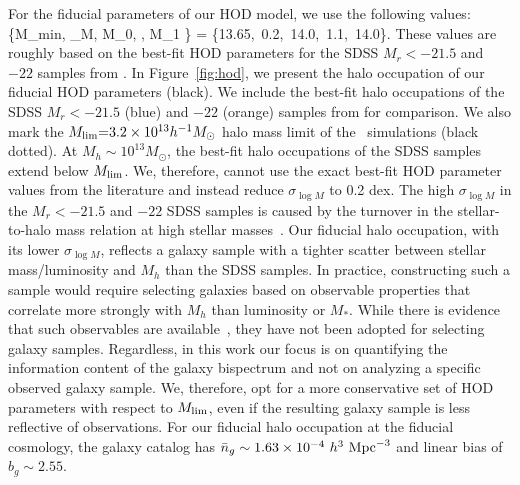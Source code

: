 For the fiducial parameters of our HOD model, we use the following values: 
\beq \label{eq:hod_fid}
\{\log M_{\rm min}, \sigma_{\log M}, \log M_0, \alpha, \log M_1 \} = \{13.65,~0.2,~14.0,~1.1,~14.0\}.
\eeq
These values are roughly based on the best-fit HOD parameters for the SDSS $M_r
< -21.5$ and $-22$ samples from \cite{zheng2007}. 
In Figure~\ref{fig:hod}, we present the halo occupation of our fiducial 
HOD parameters (black). We include the best-fit halo occupations of 
the SDSS $M_r < -21.5$ (blue)  and $-22$ (orange) samples from \cite{zheng2007}
for comparison. We also mark the  $M_{\rm lim}{=}3.2\times10^{13} h^{-1}M_\odot$ 
halo mass limit of the \quij~simulations (black dotted). At $M_h \sim 10^{13} M_\odot$, 
the best-fit halo occupations of the SDSS samples extend below $M_{\rm lim}$.
We, therefore, cannot use the exact best-fit HOD
parameter values from the literature and instead reduce $\sigma_{\log M}$ to 0.2 dex.
The high $\sigma_{\log M}$ in the $M_r < -21.5$ and $-22$ SDSS samples is
caused by the turnover in the stellar-to-halo mass relation at high stellar
masses~\citep{mandelbaum2006, conroy2007, more2011, leauthaud2012, tinker2013,
zu2015, hahn2019b}. Our fiducial halo occupation, with its lower $\sigma_{\log
M}$, reflects a galaxy sample with a tighter scatter between stellar
mass/luminosity and $M_h$ than the SDSS samples.  %
In practice, constructing such a sample would require selecting galaxies based on
observable properties that correlate more strongly with $M_h$ than 
luminosity or $M_*$. While there is evidence that such observables are 
available~\citep[\eg~$L_{\rm sat}$; ][]{alpaslan2019}, they have not been
adopted for selecting galaxy samples. Regardless, in this work
our focus is on quantifying the information content of the galaxy bispectrum 
and not on analyzing a specific observed galaxy sample. We, therefore, opt for 
a more conservative set of HOD parameters with respect to $M_{\rm lim}$, even
if the resulting galaxy sample is less reflective of observations. For our
fiducial halo occupation at the fiducial cosmology, the galaxy catalog has 
$\bar{n}_g \sim 1.63\times 10^{-4}~h^3~{\rm Mpc}^{-3}$ and linear bias of 
$b_g \sim 2.55$.


